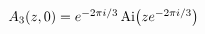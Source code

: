 $\mathop{A_{3}\/}\nolimits\!\left(z,0\right)=e^{-2\pi i/3}\mathop{\mathrm{Ai}\/%
}\nolimits\!\left(ze^{-2\pi i/3}\right)$